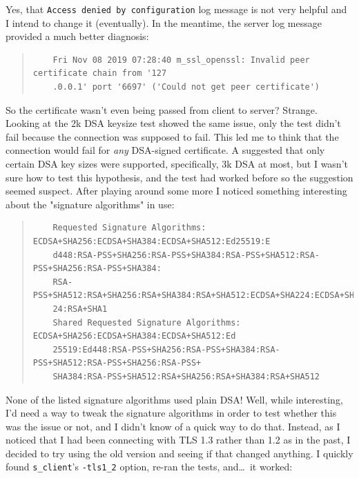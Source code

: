 \documentclass{article}
\begin{document}
Yes, that \texttt{Access denied by configuration} log message is not very helpful and I intend to change it (eventually).  In the meantime, the server log message provided a much better diagnosis:

\begin{quote}
\begin{verbatim}
	Fri Nov 08 2019 07:28:40 m_ssl_openssl: Invalid peer certificate chain from '127
	.0.0.1' port '6697' ('Could not get peer certificate')
\end{verbatim}
\end{quote}

So the certificate wasn't even being passed from client to server?  Strange.  Looking at the 2k DSA keysize test showed the same issue, only the test didn't fail because the connection was supposed to fail.  This led me to think that the connection would fail for \emph{any} DSA-signed certificate.  A  suggested that only certain DSA key sizes were supported, specifically, 3k DSA at most, but I wasn't sure how to test this hypothesis, and the test had worked before so the suggestion seemed suspect.  After playing around some more I noticed something interesting about the "signature algorithms" in use:

\begin{quote}
\begin{verbatim}
	Requested Signature Algorithms: ECDSA+SHA256:ECDSA+SHA384:ECDSA+SHA512:Ed25519:E
	d448:RSA-PSS+SHA256:RSA-PSS+SHA384:RSA-PSS+SHA512:RSA-PSS+SHA256:RSA-PSS+SHA384:
	RSA-PSS+SHA512:RSA+SHA256:RSA+SHA384:RSA+SHA512:ECDSA+SHA224:ECDSA+SHA1:RSA+SHA2
	24:RSA+SHA1
	Shared Requested Signature Algorithms: ECDSA+SHA256:ECDSA+SHA384:ECDSA+SHA512:Ed
	25519:Ed448:RSA-PSS+SHA256:RSA-PSS+SHA384:RSA-PSS+SHA512:RSA-PSS+SHA256:RSA-PSS+
	SHA384:RSA-PSS+SHA512:RSA+SHA256:RSA+SHA384:RSA+SHA512
\end{verbatim}
\end{quote}

None of the listed signature algorithms used plain DSA!  Well, while interesting, I'd need a way to tweak the signature algorithms in order to test whether this was the issue or not, and I didn't know of a quick way to do that.  Instead, as I noticed that I had been connecting with TLS 1.3 rather than 1.2 as in the past, I decided to try using the old version and seeing if that changed anything.  I quickly found \texttt{s_client}'s \texttt{-tls1_2} option, re-ran the tests, and\ldots~it worked:
\end{document}
